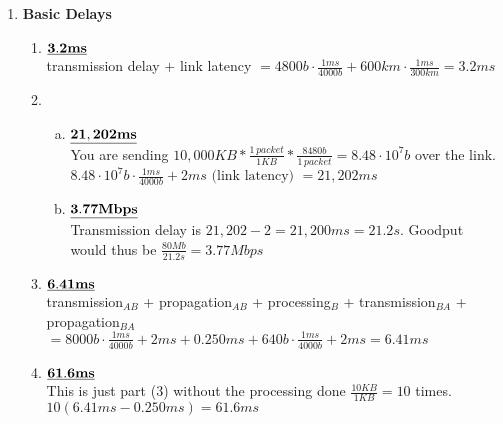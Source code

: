 \documentclass[11pt,fleqn]{article}
\begin{document}
\begin{enumerate}[1)]

\item  \textbf{Basic Delays}
\begin{enumerate}[1.]
\item ${\bf\underline{3.2ms}}$ \\ transmission delay $+$ link latency $\displaystyle = 4800b \cdot \frac {1ms}{4000b} + 600km \cdot \frac {1ms}{300km} = 3.2 ms$
\item
\begin{enumerate}[(a)]
\item ${\bf\underline{21,202ms}}$ \\ You are sending $\displaystyle 10,000KB * \frac {1\,packet}{1 KB} * \frac {8480b}{1\,packet} = 8.48 \cdot 10^7 b$ over the link. \\ $\displaystyle 8.48 \cdot 10^7 b \cdot \frac {1ms}{4000b} + 2ms \text{ (link latency) } = 21,202 ms$
\item ${\bf\underline{3.77 Mbps}}$ \\ Transmission delay is $21,202 - 2 = 21,200 ms = 21.2s$. Goodput would thus be $\displaystyle \frac {80Mb}{21.2s} = 3.77 Mbps$
\end{enumerate}
\item ${\bf\underline{6.41ms}}$ \\ transmission$_{AB}$ + propagation$_{AB}$ + processing$_{B}$ + transmission$_{BA}$ + propagation$_{BA}$ \\ $\displaystyle = 8000b \cdot \frac {1ms}{4000b} + 2ms + 0.250ms + 640b \cdot \frac {1ms}{4000b} + 2ms = 6.41ms$
\item ${\bf\underline{61.6ms}}$ \\ This is just part (3) without the processing done $\displaystyle \frac {10KB}{1KB} = 10$ times. \\ $10(6.41ms - 0.250ms) = 61.6ms$
\end{enumerate}


\end{enumerate}
\end{document}
